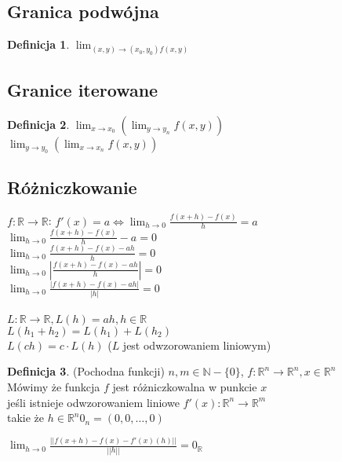 \documentclass{article}
\theoremstyle{definition}
\newtheorem{de}{Definicja}[subsection]
\theoremstyle{definition}
\theoremstyle{definition}
\theoremstyle{definition}
\theoremstyle{definition}
\theoremstyle{definition}
\theoremstyle{definition}
\begin{document}
\subsection{Granica podwójna}

\begin{de}
    $\lim_{(x,y)\rightarrow(x_0,y_0) f(x,y)}$
\end{de}

\subsection{Granice iterowane}

\begin{de}
    $\lim_{x\rightarrow x_0} (\lim_{y\rightarrow y_n} f(x,y))$\\
    $\lim_{y\rightarrow y_0} (\lim_{x\rightarrow x_n} f(x,y))$
\end{de}

\subsection{Różniczkowanie}

$f: \mathbb{R} \rightarrow \mathbb{R}$:
$f'(x) = a \iff \lim_{h\rightarrow 0} \frac{f(x+h)-f(x)}{h}=a$\\
$\lim_{h\rightarrow 0} \frac{f(x+h)-f(x)}{h} - a = 0$\\
$\lim_{h\rightarrow 0} \frac{f(x+h)-f(x)-ah}{h} = 0$\\
$\lim_{h\rightarrow 0} \left|\frac{f(x+h)-f(x)-ah}{h}\right| = 0$\\
$\lim_{h\rightarrow 0} \frac{|f(x+h)-f(x)-ah|}{|h|} = 0$\\\\
$L: \mathbb{R} \rightarrow \mathbb{R}, L(h)= ah, h\in\mathbb{R}$\\
$L(h_1+h_2) = L(h_1) + L(h_2)$\\
$L(ch)=c\cdot L(h)$ ($L$ jest odwzorowaniem liniowym)\\

\begin{de}
    (Pochodna funkcji) $n, m \in \mathbb{N}-\{0\}$, $f: \mathbb{R}^n \rightarrow \mathbb{R}^n, x \in \mathbb{R}^n$\\
    Mówimy że funkcja $f$ jest różniczkowalna w punkcie $x$\\
    jeśli istnieje odwzorowaniem liniowe $f'(x): \mathbb{R}^n \rightarrow \mathbb{R}^m$\\
    takie że $h\in\mathbb{R}^n 0_n = (0,0,\dots, 0)$

    \begin{center}
        $\lim_{h\rightarrow 0} \frac{||f(x+h)-f(x)-f'(x)(h)||}{||h||} = 0_{\mathbb{R}}$
    \end{center}
\end{de}
\end{document}

